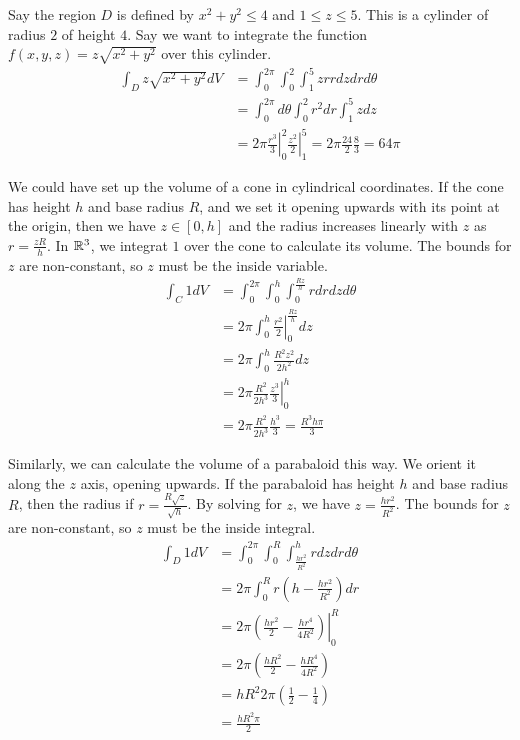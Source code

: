 \documentclass[fleqn,letterpaper]{report}
\begin{document}
\begin{example}
Say the region $D$ is defined by $x^2 + y^2 \leq 4$ and $1
\leq z \leq 5$. This is a cylinder of radius $2$ of height
$4$. Say we want to integrate the function $f(x,y,z) =
z\sqrt{x^2+y^2}$ over this cylinder.
\begin{align*}
\int_D z\sqrt{x^2+y^2} dV & = \int_0^{2\pi} \int_0^2 \int_1^5
z r r dz dr d\theta \\
& = \int_0^{2\pi} d\theta \int_0^2 r^2 dr \int_1^5 z dz \\
& = 2\pi \left. \frac{r^3}{3} \right|_0^2 \left. \frac{z^2}{2}
\right|_1^5 = 2\pi \frac{24}{2} \frac{8}{3} = 64\pi 
\end{align*}
\end{example}

\begin{example}
We could have set up the volume of a cone in cylindrical
coordinates. If the cone has height $h$ and base radius $R$,
and we set it opening upwards with its point at the origin,
then we have $z \in [0,h]$ and the radius increases linearly
with $z$ as $r = \frac{zR}{h}$. In $\mathbb{R}^3$, we integrat $1$
over the cone to calculate its volume. The bounds for $z$ are
non-constant, so $z$ must be the inside variable.
\begin{align*}
\int_C 1 dV & = \int_0^{2\pi} \int_0^h \int_0^{\frac{Rz}{h}} r
dr dz d\theta \\
& = 2\pi \int_0^h \left. \frac{r^2}{2}
\right|_0^{\frac{Rz}{h}} dz \\
& = 2\pi \int_0^h \frac{R^2 z^2}{2h^2} dz \\
& = 2\pi \left. \frac{R^2}{2h^3} \frac{z^3}{3} \right|_0^h \\
& = 2\pi \frac{R^2}{2h^3} \frac{h^3}{3} = \frac{R^3h\pi}{3}
\end{align*}
\end{example}

\begin{example}
Similarly, we can calculate the volume of a parabaloid this
way. We orient it along the $z$ axis, opening upwards. If
the parabaloid has height $h$ and base radius $R$, then the
radius if $r = \frac{R\sqrt{z}}{\sqrt{h}}$. By solving for
$z$, we have $z = \frac{hr^2}{R^2}$. The bounds for $z$ are
non-constant, so $z$ must be the inside integral.
\begin{align*}
\int_D 1 dV & = \int_0^{2\pi} \int_0^R \int_{\frac{hr^2}{R^2}}^h
r dz dr d\theta \\
& = 2\pi \int_0^R r \left( h - \frac{hr^2}{R^2} \right) dr \\
& = 2\pi \left. \left( \frac{hr^2}{2} - \frac{hr^4}{4R^2}
\right) \right|_0^R \\
& = 2\pi \left( \frac{hR^2}{2} - \frac{hR^4}{4R^2} \right) \\
& = hR^2 2\pi \left( \frac{1}{2} - \frac{1}{4} \right) \\
& = \frac{hR^2 \pi}{2}
\end{align*}
\end{example}
\end{document}

